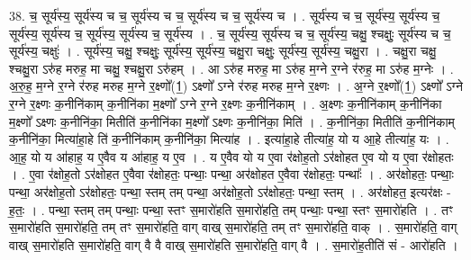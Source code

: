 \documentclass[17pt]{extarticle}
\begin{document}
38. च॒ सूर्य॑स्य॒ सूर्य॑स्य च च॒ सूर्य॑स्य च च॒ सूर्य॑स्य च च॒ सूर्य॑स्य च । . सूर्य॑स्य च च॒ सूर्य॑स्य॒ सूर्य॑स्य च॒ सूर्य॑स्य॒ सूर्य॑स्य च॒ सूर्य॑स्य॒ सूर्य॑स्य च॒ सूर्य॑स्य । . च॒ सूर्य॑स्य॒ सूर्य॑स्य च च॒ सूर्य॑स्य॒ चक्षु॒ श्चक्षुः॒ सूर्य॑स्य च च॒ सूर्य॑स्य॒ चक्षुः॑ । . सूर्य॑स्य॒ चक्षु॒ श्चक्षुः॒ सूर्य॑स्य॒ सूर्य॑स्य॒ चक्षु॒रा चक्षुः॒ सूर्य॑स्य॒ सूर्य॑स्य॒ चक्षु॒रा । . चक्षु॒रा चक्षु॒ श्चक्षु॒रा ऽरु॑ह मरुह॒ मा चक्षु॒ श्चक्षु॒रा ऽरु॑हम् । . आ ऽरु॑ह मरुह॒ मा ऽरु॑ह म॒ग्ने र॒ग्ने र॑रुह॒ मा ऽरु॑ह म॒ग्नेः । . अ॒रु॒ह॒ म॒ग्ने र॒ग्ने र॑रुह मरुह म॒ग्ने र॒क्ष्णो᳚(1॒) ऽक्ष्णो᳚ ऽग्ने र॑रुह मरुह म॒ग्ने र॒क्ष्णः । . अ॒ग्ने र॒क्ष्णो᳚(1॒) ऽक्ष्णो᳚ ऽग्ने र॒ग्ने र॒क्ष्णः क॒नीनि॑काम् क॒नीनि॑का म॒क्ष्णो᳚ ऽग्ने र॒ग्ने र॒क्ष्णः क॒नीनि॑काम् । . अ॒क्ष्णः क॒नीनि॑काम् क॒नीनि॑का म॒क्ष्णो᳚ ऽक्ष्णः क॒नीनि॑का॒ मितीति॑ क॒नीनि॑का म॒क्ष्णो᳚ ऽक्ष्णः क॒नीनि॑का॒ मिति॑ । . क॒नीनि॑का॒ मितीति॑ क॒नीनि॑काम् क॒नीनि॑का॒ मित्या॑हा॒हे ति॑ क॒नीनि॑काम् क॒नीनि॑का॒ मित्या॑ह । . इत्या॑हा॒हे तीत्या॑ह॒ यो य आ॒हे तीत्या॑ह॒ यः । . आ॒ह॒ यो य आ॑हाह॒ य ए॒वैव य आ॑हाह॒ य ए॒व । . य ए॒वैव यो य ए॒वा र॑क्षोह॒तो ऽर॑क्षोहत ए॒व यो य ए॒वा र॑क्षोहतः । . ए॒वा र॑क्षोह॒तो ऽर॑क्षोहत ए॒वैवा र॑क्षोहतः॒ पन्थाः॒ पन्था॒ अर॑क्षोहत ए॒वैवा र॑क्षोहतः॒ पन्थाः᳚ । . अर॑क्षोहतः॒ पन्थाः॒ पन्था॒ अर॑क्षोह॒तो ऽर॑क्षोहतः॒ पन्था॒ स्तम् तम् पन्था॒ अर॑क्षोह॒तो ऽर॑क्षोहतः॒ पन्था॒ स्तम् । . अर॑क्षोहत॒ इत्यर॑क्षः - ह॒तः॒ । . पन्था॒ स्तम् तम् पन्थाः॒ पन्था॒ स्तꣳ स॒मारो॑हति स॒मारो॑हति॒ तम् पन्थाः॒ पन्था॒ स्तꣳ स॒मारो॑हति । . तꣳ स॒मारो॑हति स॒मारो॑हति॒ तम् तꣳ स॒मारो॑हति॒ वाग् वाख् स॒मारो॑हति॒ तम् तꣳ स॒मारो॑हति॒ वाक् । . स॒मारो॑हति॒ वाग् वाख् स॒मारो॑हति स॒मारो॑हति॒ वाग् वै वै वाख् स॒मारो॑हति स॒मारो॑हति॒ वाग् वै । . स॒मारो॑ह॒तीति॑ सं - आरो॑हति । \newline
\pagebreak
{}
\end{document}
